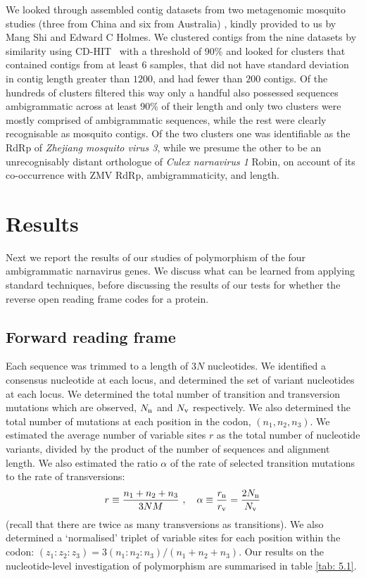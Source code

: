 \documentclass[unnumsec,webpdf,contemporary,large,namedate]{oup-authoring-template}%
\theoremstyle{thmstyleone}%
\theoremstyle{thmstyletwo}%
\theoremstyle{thmstylethree}%
\begin{document}
We looked through assembled contig datasets from two metagenomic mosquito
studies (three from China and six from Australia) \citep{shi_16,shi_17}, kindly
provided to us by Mang Shi and Edward C Holmes.  We clustered contigs from the
nine datasets by similarity using CD-HIT~\citep{fu_12} with a threshold of 90\%
and looked for clusters that contained contigs from at least $6$ samples, that
did not have standard deviation in contig length greater than $1 200$, and had
fewer than $200$ contigs.  Of the hundreds of clusters filtered this way only a
handful also possessed sequences ambigrammatic across at least 90\% of their
length and only two clusters were mostly comprised of ambigrammatic sequences,
while the rest were clearly recognisable as mosquito contigs.  Of the two
clusters one was identifiable as the RdRp of \emph{Zhejiang mosquito virus 3}, while
we presume the other to be an unrecognisably distant orthologue of \emph{Culex
narnavirus 1} Robin, on account of its co-occurrence with ZMV RdRp,
ambigrammaticity, and length.

\section{Results}
\label{sec: 5}

Next we report the results of our studies of polymorphism of the four ambigrammatic narnavirus genes.
We discuss what can be learned from applying standard techniques, before discussing
the results of our tests for whether the reverse open reading frame codes for a protein.

\subsection{Forward reading frame}
\label{sec: 5.1}

Each sequence was trimmed to a length of $3N$ nucleotides. We identified a consensus
nucleotide at each locus, and determined the set of variant nucleotides at each locus.
We determined the total number of transition and transversion mutations which are observed,
$N_{\rm n}$ and $N_{\rm v}$ respectively. We also determined the total number
of mutations at each position in the codon, $(n_1,n_2,n_3)$.
We estimated the average number of variable sites $r$ as the total number of nucleotide variants,
divided by the product of the number of sequences and alignment length. We also
estimated the ratio $\alpha$ of the rate of selected transition mutations to the rate of transversions:
%
\begin{equation}
\label{eq: 5.1}
r\equiv \frac{n_1+n_2+n_3}{3NM}
\ ,\ \ \
\alpha\equiv \frac{r_{\rm n}}{r_{\rm v}}=\frac{2N_{\rm n}}{N_{\rm v}}
\end{equation}
%
(recall that there are twice as many transversions as transitions). We also determined a \lq normalised'
triplet of variable sites for each position within the codon: $(z_1:z_2:z_3)=3(n_1:n_2:n_3)/(n_1+n_2+n_3)$.
Our results on the nucleotide-level
investigation of polymorphism are summarised in table \ref{tab: 5.1}.
\end{document}
